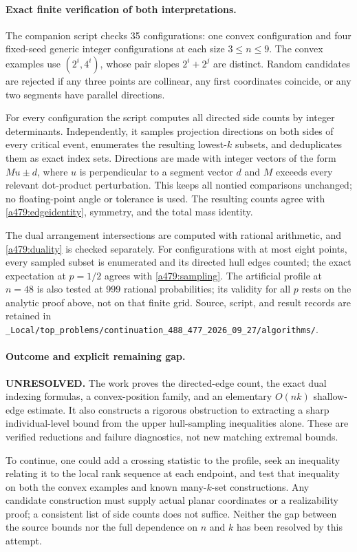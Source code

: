\documentclass[11pt]{article}
\begin{document}
\paragraph{Exact finite verification of both interpretations.}
The companion script checks 35 configurations: one convex configuration
and four fixed-seed generic integer configurations at each size
$3\leq n\leq9$. The convex examples use
$(2^i,4^i)$, whose pair slopes $2^i+2^j$ are distinct. Random candidates
are rejected if any three points are collinear, any first coordinates
coincide, or any two segments have parallel directions.

For every configuration the script computes all directed side counts by
integer determinants. Independently, it samples projection directions on
both sides of every critical event, enumerates the resulting lowest-$k$
subsets, and deduplicates them as exact index sets. Directions are made
with integer vectors of the form $M u\pm d$, where $u$ is perpendicular
to a segment vector $d$ and $M$ exceeds every relevant dot-product
perturbation. This keeps all nontied comparisons unchanged; no floating-point
angle or tolerance is used. The resulting counts agree with
\eqref{a479:edgeidentity}, symmetry, and the total mass identity.

The dual arrangement intersections are computed with rational arithmetic,
and \eqref{a479:duality} is checked separately. For configurations with
at most eight points, every sampled subset is enumerated and its directed
hull edges counted; the exact expectation at $p=1/2$ agrees with
\eqref{a479:sampling}. The artificial profile at $n=48$ is also tested
at 999 rational probabilities; its validity for all $p$ rests on the
analytic proof above, not on that finite grid. Source, script, and result
records are retained in
\nolinkurl{_Local/top_problems/continuation_488_477_2026_09_27/algorithms/}.

\paragraph{Outcome and explicit remaining gap.}
\textbf{UNRESOLVED.} The work proves the directed-edge count, the exact
dual indexing formulas, a convex-position family, and an elementary
$O(nk)$ shallow-edge estimate. It also constructs a rigorous obstruction
to extracting a sharp individual-level bound from the upper hull-sampling
inequalities alone. These are verified reductions and failure diagnostics,
not new matching extremal bounds.

To continue, one could add a crossing statistic to the profile, seek an
inequality relating it to the local rank sequence at each endpoint, and
test that inequality on both the convex examples and known many-$k$-set
constructions. Any candidate construction must supply actual planar
coordinates or a realizability proof; a consistent list of side counts
does not suffice. Neither the gap between the source bounds nor the full
dependence on $n$ and $k$ has been resolved by this attempt.
\end{document}
